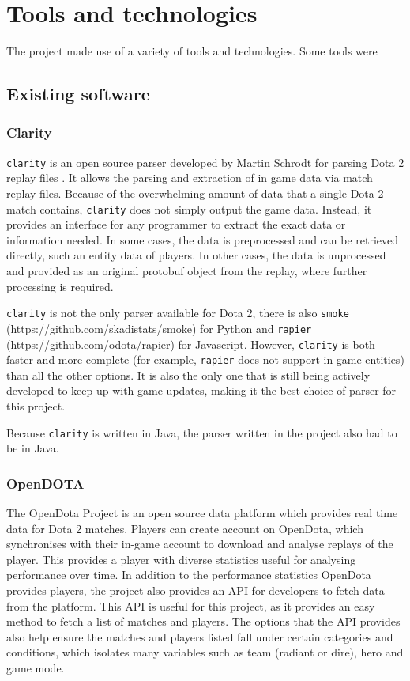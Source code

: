 \documentclass[Report.tex]{subfiles}
\begin{document}
\section{Tools and technologies}
The project made use of a variety of tools and technologies. Some tools were 

\subsection{Existing software}

\subsubsection{Clarity}
\texttt{clarity} is an open source parser developed by Martin Schrodt for parsing Dota 2 replay files \cite{clarity}. It allows the parsing and extraction of in game data via match replay files. Because of the overwhelming amount of data that a single Dota 2 match contains, \texttt{clarity} does not simply output the game data. Instead, it provides an interface for any programmer to extract the exact data or information needed. In some cases, the data is preprocessed and can be retrieved directly, such an entity data of players. In other cases, the data is unprocessed and provided as an original protobuf object from the replay, where further processing is required. 

\texttt{clarity} is not the only parser available for Dota 2, there is also \texttt{smoke} (https://github.com/skadistats/smoke) for Python and \texttt{rapier} (https://github.com/odota/rapier) for Javascript. However, \texttt{clarity} is both faster and more complete (for example, \texttt{rapier} does not support in-game entities) than all the other options. It is also the only one that is still being actively developed to keep up with game updates, making it the best choice of parser for this project. 

Because \texttt{clarity} is written in Java, the parser written in the project also had to be in Java. 


\subsubsection{OpenDOTA}
The OpenDota Project \cite{opendota} is an open source data platform which provides real time data for Dota 2 matches. Players can create account on OpenDota, which synchronises with their in-game account to download and analyse replays of the player. This provides a player with diverse statistics useful for analysing performance over time. In addition to the performance statistics OpenDota provides players, the project also provides an API for developers to fetch data from the platform. This API is useful for this project, as it provides an easy method to fetch a list of matches and players. The options that the API provides also help ensure the matches and players listed fall under certain categories and conditions, which isolates many variables such as team (radiant or dire), hero and game mode. 
\end{document}
